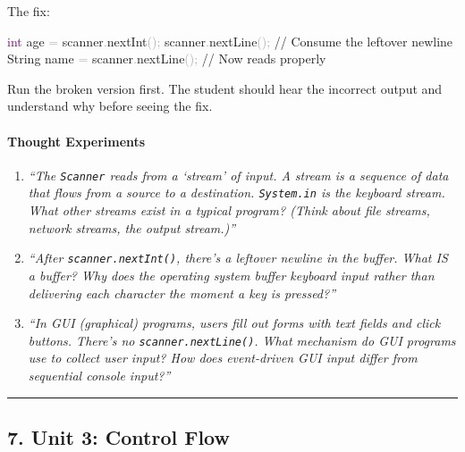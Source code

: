\documentclass[
  justified,
  openright,
]{tufte-book}
\let\paragraph\paragraph
\newcommand{\BuiltInTok}[1]{#1}
\newcommand{\CommentTok}[1]{\textcolor{MidGray}{#1}}
\newcommand{\DataTypeTok}[1]{\textcolor{Purple}{#1}}
\newcommand{\FunctionTok}[1]{\textcolor{BrandBlue}{#1}}
\newcommand{\NormalTok}[1]{#1}
\newcommand{\OperatorTok}[1]{\textcolor{DarkGray}{#1}}
\newenvironment{Shaded}{%
  \begin{snugshade}
}{%
  \end{snugshade}
}
\let\paragraph\paragraph
\begin{document}
The fix:

\begin{Shaded}
\begin{Highlighting}[]
\DataTypeTok{int}\NormalTok{ age }\OperatorTok{=}\NormalTok{ scanner}\OperatorTok{.}\FunctionTok{nextInt}\OperatorTok{();}
\NormalTok{scanner}\OperatorTok{.}\FunctionTok{nextLine}\OperatorTok{();}          \CommentTok{// Consume the leftover newline}
\BuiltInTok{String}\NormalTok{ name }\OperatorTok{=}\NormalTok{ scanner}\OperatorTok{.}\FunctionTok{nextLine}\OperatorTok{();}   \CommentTok{// Now reads properly}
\end{Highlighting}
\end{Shaded}

Run the broken version first. The student should hear the incorrect
output and understand why before seeing the fix.

\paragraph{Thought Experiments}\label{thought-experiments-3}

\begin{enumerate}
\def\labelenumi{\arabic{enumi}.}
\item
  \emph{``The \texttt{Scanner} reads from a `stream' of input. A stream
  is a sequence of data that flows from a source to a destination.
  \texttt{System.in} is the keyboard stream. What other streams exist in
  a typical program? (Think about file streams, network streams, the
  output stream.)''}
\item
  \emph{``After \texttt{scanner.nextInt()}, there's a leftover newline
  in the buffer. What IS a buffer? Why does the operating system buffer
  keyboard input rather than delivering each character the moment a key
  is pressed?''}
\item
  \emph{``In GUI (graphical) programs, users fill out forms with text
  fields and click buttons. There's no \texttt{scanner.nextLine()}. What
  mechanism do GUI programs use to collect user input? How does
  event-driven GUI input differ from sequential console input?''}
\end{enumerate}

\begin{center}\rule{0.5\linewidth}{0.5pt}\end{center}

\subsection{7. Unit 3: Control Flow}\label{unit-3-control-flow}
\end{document}

